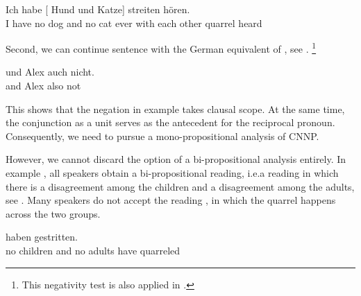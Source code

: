 \documentclass[output=paper]{langsci/langscibook}
\begin{document}
\ea \label{ex-refl-npi}
{\gll Ich habe [ Hund und  Katze] 
   streiten hören.\\
  I have  \hphantom{[}no dog and no cat ever {with each other} quarrel heard\\
  \glt {}}
\z 

Second, we can continue sentence  with the German equivalent of , see .%
\footnote{This negativity test is also applied in \citet{Zeijlstra:17}.}

\ea \label{ex-refl-neither}
\gll {} und Alex auch nicht.\\
{} and Alex also not\\
\glt {}
\z 

This shows that the negation in example  takes clausal scope. At the same time, the conjunction as a unit serves as the antecedent for the reciprocal pronoun. Consequently, we need to pursue a mono-propositional analysis of CNNP. 


However, we cannot discard the option of a bi-propositional analysis entirely. 
In example , all speakers obtain a bi-propositional reading, i.e.\@ a reading in which there is a disagreement among the children and a disagreement among the adults, see .
Many speakers do not accept the reading , in which the quarrel happens across the two groups.


\ea \label{ex-eltern}
 haben gestritten.\\
\hphantom{[}no children and no adults have quarreled\\
\glt {}
\begin{xlist}
\end{xlist}
\z
\end{document}
